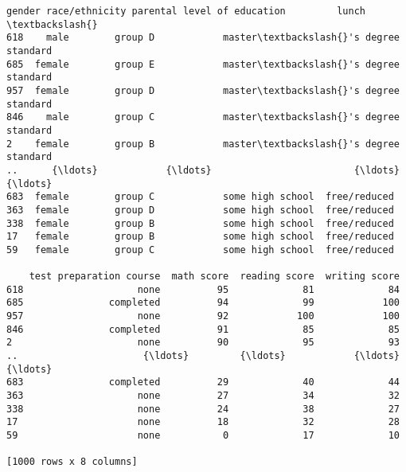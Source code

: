             \begin{tcolorbox}[breakable, size=fbox, boxrule=.5pt, pad at break*=1mm, opacityfill=0]
\begin{Verbatim}[commandchars=\\\{\}]
     gender race/ethnicity parental level of education         lunch  \textbackslash{}
618    male        group D            master\textbackslash{}'s degree      standard
685  female        group E            master\textbackslash{}'s degree      standard
957  female        group D            master\textbackslash{}'s degree      standard
846    male        group C            master\textbackslash{}'s degree      standard
2    female        group B            master\textbackslash{}'s degree      standard
..      {\ldots}            {\ldots}                         {\ldots}           {\ldots}
683  female        group C            some high school  free/reduced
363  female        group D            some high school  free/reduced
338  female        group B            some high school  free/reduced
17   female        group B            some high school  free/reduced
59   female        group C            some high school  free/reduced

    test preparation course  math score  reading score  writing score
618                    none          95             81             84
685               completed          94             99            100
957                    none          92            100            100
846               completed          91             85             85
2                      none          90             95             93
..                      {\ldots}         {\ldots}            {\ldots}            {\ldots}
683               completed          29             40             44
363                    none          27             34             32
338                    none          24             38             27
17                     none          18             32             28
59                     none           0             17             10

[1000 rows x 8 columns]
\end{Verbatim}
\end{tcolorbox}